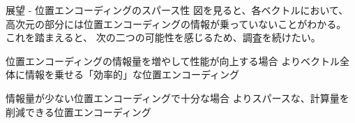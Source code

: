 \documentclass[dvipdfm]{beamer}
\begin{document}
    \begin{frame}{展望 - 位置エンコーディングのスパース性}
        図を見ると、各ベクトルにおいて、
        高次元の部分には位置エンコーディングの情報が乗っていないことがわかる。
        これを踏まえると、
        次の二つの可能性を感じるため、調査を続けたい。
        \begin{block}{位置エンコーディングの情報量を増やして性能が向上する場合}
            よりベクトル全体に情報を乗せる「効率的」な位置エンコーディング
        \end{block}
        \begin{block}{情報量が少ない位置エンコーディングで十分な場合}
            よりスパースな、計算量を削減できる位置エンコーディング
        \end{block}
    \end{frame}
\end{document}
